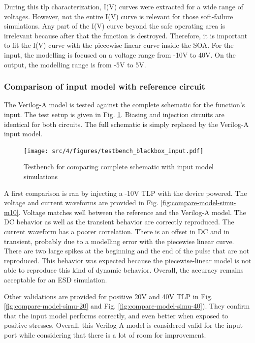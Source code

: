 During this \gls{tlp} characterization, I(V) curves were extracted for a wide range of voltages.
However, not the entire I(V) curve is relevant for those soft-failure simulations.
Any part of the I(V) curve beyond the safe operating area is irrelevant because after that the function is destroyed.
Therefore, it is important to fit the I(V) curve with the piecewise linear curve inside the SOA.
For the input, the modelling is focused on a voltage range from -10V to 40V.
On the output, the modelling range is from -5V to 5V.

\subsubsection{Comparison of input model with reference circuit}

The Verilog-A model is tested against the complete schematic for the function's input.
The test setup is given in Fig. \ref{fig:compare-veriloga-model-input}.
Biasing and injection circuits are identical for both circuits.
The full schematic is simply replaced by the Verilog-A input model.

\begin{figure}[!h]
  \centering
  \texttt{[image: src/4/figures/testbench\_blackbox\_input.pdf]}
  \caption{Testbench for comparing complete schematic with input model simulations}
  \label{fig:compare-veriloga-model-input}
\end{figure}

A first comparison is ran by injecting a -10V TLP with the device powered.
The voltage and current waveforms are provided in Fig. \ref{fig:compare-model-simu-m10}.
Voltage matches well between the reference and the Verilog-A model.
The DC behavior as well as the transient behavior are correctly reproduced.
The current waveform has a poorer correlation.
There is an offset in DC and in transient, probably due to a modelling error with the piecewise linear curve.
There are two large spikes at the beginning and the end of the pulse that are not reproduced.
This behavior was expected because the piecewise-linear model is not able to reproduce this kind of dynamic behavior.
Overall, the accuracy remains acceptable for an ESD simulation.

Other validations are provided for positive 20V and 40V TLP in Fig. \ref{fig:compare-model-simu-20} and Fig. \ref{fig:compare-model-simu-40}).
They confirm that the input model performs correctly, and even better when exposed to positive stresses.
Overall, this Verilog-A model is considered valid for the input port while considering that there is a lot of room for improvement.

